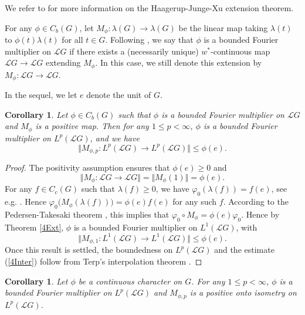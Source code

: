 \documentclass[12pt]{amsart}
\newcommand{\norm}[1]{\Vert#1\Vert}
\newcommand{\bignorm}[1]{\bigl\Vert#1\bigr\Vert}
\newtheorem{corollary}[theorem]{Corollary}
\theoremstyle{remark}
\theoremstyle{definition}
\numberwithin{equation}{section}
\begin{document}
We refer to \cite{JX, LMZ2} for more information on the  Haagerup-Junge-Xu extension theorem.


For any $\phi\in C_b(G)$, let 
$M_\phi\colon\lambda(G)\to\lambda(G)$ be the linear map taking 
$\lambda(t)$  to $\phi(t)\lambda(t)$ for all $t\in G$. Following \cite{DCH}, we
say that $\phi$ is a bounded Fourier multiplier on ${\mathcal L}G$ if
there exists a (necessarily unique) $w^*$-continuous map ${\mathcal L}G\to {\mathcal L}G$
extending $M_\phi$.  In this case, we still denote this extension by
$M_\phi\colon{\mathcal L}G\to {\mathcal L}G$.

In the sequel, we let $e$ denote the unit of $G$. 

\begin{corollary}\label{4ExtFourier}
Let $\phi\in C_b(G)$ such that $\phi$ is a bounded Fourier multiplier on ${\mathcal L}G$
and $M_\phi$ is a positive map.
Then for any $1\leq p<\infty$, $\phi$ is a bounded Fourier multiplier on $L^p({\mathcal L}G)$, and we have
\begin{equation}\label{4Inter}
\norm{M_{\phi,p}\colon L^p({\mathcal L}G)\longrightarrow L^p({\mathcal L}G)}\leq \phi(e).
\end{equation}
\end{corollary}

\begin{proof}
The positivity assumption ensures that $\phi(e)\geq 0$ and 
$$
\bignorm{M_\phi\colon {\mathcal L}G\longrightarrow {\mathcal L}G} =\norm{M_\phi(1)}=
\phi(e).
$$
For any $f\in C_c(G)$ such that $\lambda(f)\geq 0$, we have
$\varphi_0(\lambda(f))= f(e)$, see e.g. \cite[§18.17]{Stra}.
Hence
$\varphi_0\bigl(M_\phi(\lambda(f))\bigr)= \phi(e) f(e)$ for any such $f$.
According to the Pedersen-Takesaki theorem \cite[Theorem 6.2]{Stra}, this implies that 
$
\varphi_0\circ M_\phi  =\phi(e)\varphi_0.
$
Hence by Theorem \ref{4Ext}, $\phi$ is a bounded Fourier multiplier on $L^1({\mathcal L}G)$, with
$$
\bignorm{M_{\phi,1}\colon L^1({\mathcal L}G)\longrightarrow L^1({\mathcal L}G)}\leq\phi(e).
$$
Once this result is settled, the boundedness on $L^p({\mathcal L}G)$ and the estimate (\ref{4Inter})
follow from Terp's interpolation theorem \cite[Section 2]{Terp1}.
\end{proof}




\begin{corollary}\label{4Easy}
Let $\phi$ be a continuous character on $G$.
For any $1\leq p<\infty$, $\phi$ is a bounded  Fourier multiplier on $L^p({\mathcal L}G)$
and $M_{\phi,p}$ is a positive onto isometry on $L^p({\mathcal L}G)$.
\end{corollary}
\end{document}
